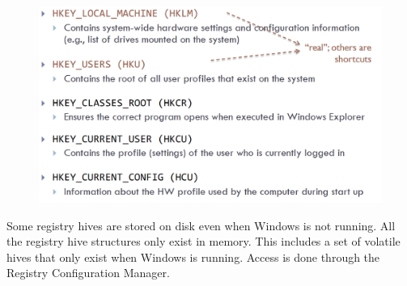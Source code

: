 \documentclass[10pt,a4paper]{report}
\begin{document}
\begin{figure}[H]
\centering
\includegraphics[scale=0.4]{36.png}
\end{figure}
Some registry hives are stored on disk even
when Windows is not running. All the registry hive structures only exist in memory. This includes a set of volatile hives that only exist when Windows is running. Access is done through the Registry
Configuration Manager.
\end{document}
